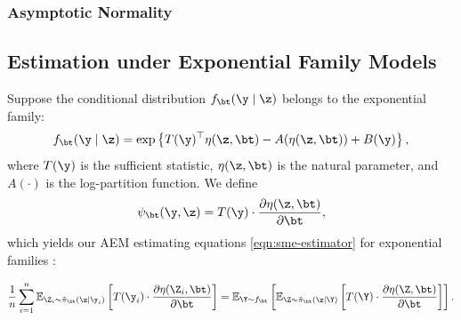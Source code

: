 \subsubsection{Asymptotic Normality}

\subsection{Estimation under Exponential Family Models}
\label{sct:exponential-family}

Suppose the conditional distribution \( f_\bt(\y \mid \z) \) belongs to the exponential family:
\[
f_\bt(\y \mid \z) = \exp\left\{ T(\y)^\top \eta(\z, \bt) - A(\eta(\z, \bt)) + B(\y) \right\},
\]
where \( T(\y) \) is the sufficient statistic, \( \eta(\z, \bt) \) is the natural parameter, and \( A(\cdot) \) is the log-partition function. We define
\begin{equation}
\psi_\bt(\y, \z) = T(\y) \cdot \frac{\partial \eta(\z, \bt)}{\partial \bt},
\label{eqn:psi-expfam}
\end{equation}
%
which yields our AEM estimating equations \eqref{eqn:sme-estimator} for exponential families :

\begin{tcolorbox}[colback=blue!3!white,colframe=blue!70!black,title=AEM Exponential Family Estimating Equation]
\begin{equation}
\label{eqn:sme-expfam}
\frac{1}{n} \sum_{i=1}^n 
\mathbb{E}_{\Z_i\sim\tilde\pi_\bt(\z \mid \y_i)} 
\left[
T(\y_i) \cdot 
\frac{\partial \eta(\Z_i, \bt)}{\partial \bt}
\right]
=
\mathbb{E}_{\Y \sim f_\bt}
\left[
\mathbb{E}_{\Z\sim\tilde\pi_\bt(\z \mid \Y)} 
\left[ 
T(\Y) \cdot 
\frac{\partial \eta(\Z, \bt)}{\partial \bt}
\right]
\right].
\end{equation}
\end{tcolorbox}

